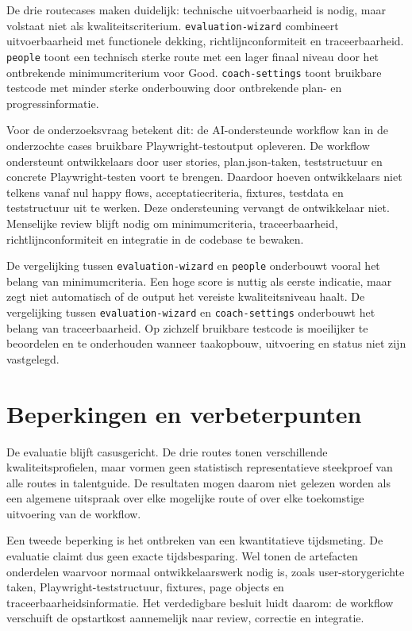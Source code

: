 De drie routecases maken duidelijk: technische uitvoerbaarheid is nodig, maar volstaat niet als kwaliteitscriterium. \texttt{evaluation-wizard} combineert uitvoerbaarheid met functionele dekking, richtlijnconformiteit en traceerbaarheid. \texttt{people} toont een technisch sterke route met een lager finaal niveau door het ontbrekende minimumcriterium voor Good. \texttt{coach-settings} toont bruikbare testcode met minder sterke onderbouwing door ontbrekende plan- en progressinformatie.

Voor de onderzoeksvraag betekent dit: de AI-ondersteunde workflow kan in de onderzochte cases bruikbare Playwright-testoutput opleveren. De workflow ondersteunt ontwikkelaars door user stories, plan.json-taken, teststructuur en concrete Playwright-testen voort te brengen. Daardoor hoeven ontwikkelaars niet telkens vanaf nul happy flows, acceptatiecriteria, fixtures, testdata en teststructuur uit te werken. Deze ondersteuning vervangt de ontwikkelaar niet. Menselijke review blijft nodig om minimumcriteria, traceerbaarheid, richtlijnconformiteit en integratie in de codebase te bewaken.

De vergelijking tussen \texttt{evaluation-wizard} en \texttt{people} onderbouwt vooral het belang van minimumcriteria. Een hoge score is nuttig als eerste indicatie, maar zegt niet automatisch of de output het vereiste kwaliteitsniveau haalt. De vergelijking tussen \texttt{evaluation-wizard} en \texttt{coach-settings} onderbouwt het belang van traceerbaarheid. Op zichzelf bruikbare testcode is moeilijker te beoordelen en te onderhouden wanneer taakopbouw, uitvoering en status niet zijn vastgelegd.

\section{Beperkingen en verbeterpunten}

De evaluatie blijft casusgericht. De drie routes tonen verschillende kwaliteitsprofielen, maar vormen geen statistisch representatieve steekproef van alle routes in talentguide. De resultaten mogen daarom niet gelezen worden als een algemene uitspraak over elke mogelijke route of over elke toekomstige uitvoering van de workflow.

Een tweede beperking is het ontbreken van een kwantitatieve tijdsmeting. De evaluatie claimt dus geen exacte tijdsbesparing. Wel tonen de artefacten onderdelen waarvoor normaal ontwikkelaarswerk nodig is, zoals user-storygerichte taken, Playwright-teststructuur, fixtures, page objects en traceerbaarheidsinformatie. Het verdedigbare besluit luidt daarom: de workflow verschuift de opstartkost aannemelijk naar review, correctie en integratie.

